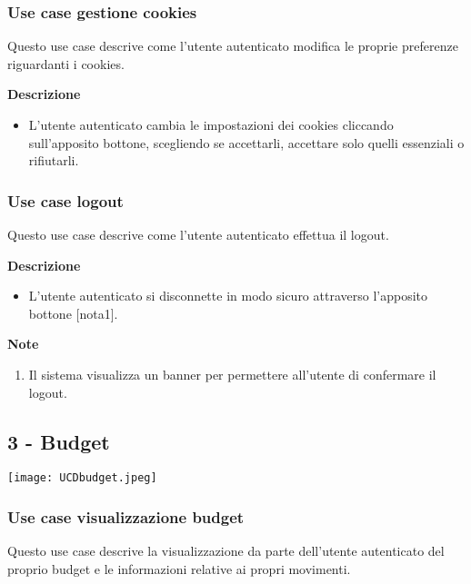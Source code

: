 \documentclass[a4paper,12pt]{article}
\begin{document}
\subsubsection*{Use case gestione cookies}

Questo use case descrive come l'utente autenticato modifica le proprie preferenze riguardanti i cookies.

\textbf{Descrizione}
\begin{itemize} \setlength\itemsep{0.01em}
\item L'utente autenticato cambia le impostazioni dei cookies cliccando sull'apposito bottone, scegliendo se accettarli, accettare solo quelli essenziali o rifiutarli.
\end{itemize}

\subsubsection*{Use case logout}

Questo use case descrive come l'utente autenticato effettua il logout.

\textbf{Descrizione}
\begin{itemize} \setlength\itemsep{0.01em}
\item L'utente autenticato si disconnette in modo sicuro attraverso l'apposito bottone [nota1].
\end{itemize}

\textbf{Note}
\begin{enumerate} \setlength\itemsep{0.01em}
\item Il sistema visualizza un banner per permettere all'utente di confermare il logout.
\end{enumerate}


\subsection*{3 - Budget}

\begin{center}
  \texttt{[image: UCDbudget.jpeg]}
\end{center}

\subsubsection*{Use case visualizzazione budget}

Questo use case descrive la visualizzazione da parte dell'utente autenticato del proprio budget e le informazioni relative ai propri movimenti.
\end{document}
